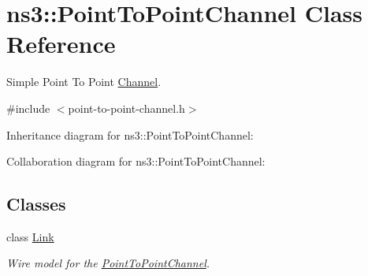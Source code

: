 \hypertarget{classns3_1_1PointToPointChannel}{}\section{ns3\+:\+:Point\+To\+Point\+Channel Class Reference}
\label{classns3_1_1PointToPointChannel}


Simple Point To Point \hyperlink{classns3_1_1Channel}{Channel}.  




{\ttfamily \#include $<$point-\/to-\/point-\/channel.\+h$>$}



Inheritance diagram for ns3\+:\+:Point\+To\+Point\+Channel\+:


Collaboration diagram for ns3\+:\+:Point\+To\+Point\+Channel\+:
\subsection*{Classes}
\begin{DoxyCompactItemize}
\item 
class \hyperlink{classns3_1_1PointToPointChannel_1_1Link}{Link}
\begin{DoxyCompactList}\small\item\em Wire model for the \hyperlink{classns3_1_1PointToPointChannel}{Point\+To\+Point\+Channel}. \end{DoxyCompactList}\end{DoxyCompactItemize}
